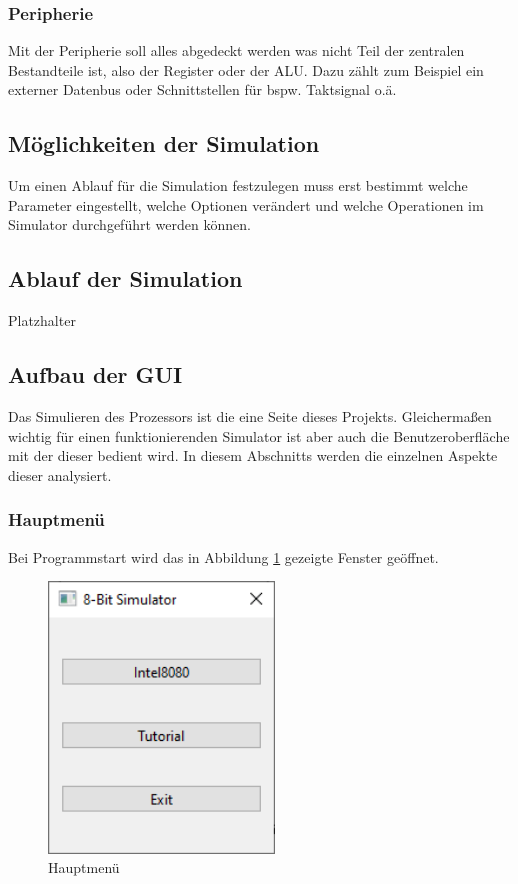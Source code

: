 \documentclass[12pt]{article}
\begin{document}
\subsubsection{Peripherie}
Mit der Peripherie soll alles abgedeckt werden was nicht Teil der zentralen Bestandteile ist, also der Register oder der ALU. Dazu zählt zum Beispiel ein externer Datenbus oder Schnittstellen für bspw. Taktsignal o.ä.

\subsection{Möglichkeiten der Simulation}
Um einen Ablauf für die Simulation festzulegen muss erst bestimmt welche Parameter eingestellt, welche Optionen verändert und welche Operationen im Simulator durchgeführt werden können.

\subsection{Ablauf der Simulation}
Platzhalter

\subsection{Aufbau der GUI}
\label{chp:AufbauGUI}
Das Simulieren des Prozessors ist die eine Seite dieses Projekts. Gleichermaßen wichtig für einen funktionierenden Simulator ist aber auch die Benutzeroberfläche mit der dieser bedient wird. In diesem Abschnitts werden die einzelnen Aspekte dieser analysiert.
\subsubsection{Hauptmenü}
Bei Programmstart wird das in Abbildung \ref{fig:Hauptmenue} gezeigte Fenster geöffnet.\vspace{10pt}

\begin{figure}[h]
\centering
\includegraphics[width=6cm]{bilder/Hauptmenue}
\caption{Hauptmenü}
\label{fig:Hauptmenue}
\end{figure}
\end{document}
